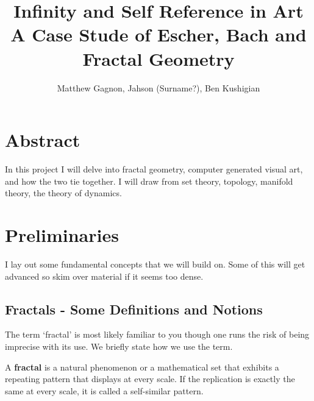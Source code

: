 \documentclass[11pt,oneside,final]{article}
\begin{document}
\title{Infinity and Self Reference in Art\\ A Case Stude of Escher, Bach and Fractal Geometry}
\author{Matthew Gagnon, Jahson (Surname?), Ben Kushigian}
\date{}
\maketitle
\tableofcontents








\section{Abstract}

In this project I will delve into fractal geometry, computer generated visual
art, and how the two tie together. I will draw from set theory, topology,
manifold theory, the theory of dynamics. 







\section{Preliminaries}
I lay out some fundamental concepts that we will build on. Some of this will get 
advanced so skim over material if it seems too dense.



\subsection{Fractals - Some Definitions and Notions}
The term `fractal' is most likely familiar to you though one runs the risk of
being imprecise with its use. We briefly state how we use the term.\\
\begin{dfn} A \textbf{fractal} is a natural phenomenon or a mathematical set
	that exhibits a repeating pattern that displays at every scale. If the 
	replication is exactly the same at every scale, it is called a self-similar
	pattern.
	\cite{wikipedia-fractals}\\

\end{dfn}
\end{document}
